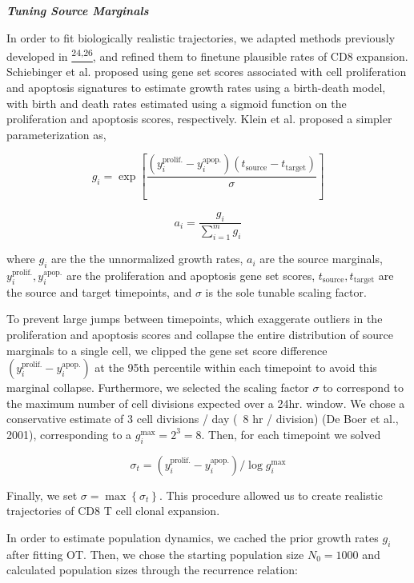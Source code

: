 \emph{\textbf{Tuning Source Marginals}}

In order to fit biologically realistic trajectories, we adapted methods
previously developed in
\href{https://sciwheel.com/work/citation?ids=6347423,17428135\&pre=\&pre=\&suf=\&suf=\&sa=0,0\&dbf=0\&dbf=0}{\textsuperscript{24,26}},
and refined them to finetune plausible rates of CD8 expansion.
Schiebinger et al. proposed using gene set scores associated with cell
proliferation and apoptosis signatures to estimate growth rates using a
birth-death model, with birth and death rates estimated using a sigmoid
function on the proliferation and apoptosis scores, respectively. Klein
et al. proposed a simpler parameterization as,

\[g_{i} = \mathrm{\exp}\left\lbrack \frac{(y_{i}^{\mathrm{\text{prolif.}}} - y_{i}^{\mathrm{\text{apop.}}})(t_{\mathrm{\text{source}}} - t_{\mathrm{\text{target}}})}{\sigma} \right\rbrack\]

\[a_{i} = \frac{g_{i}}{\sum_{i = 1}^{m}g_{i}}\]

where \(g_{i}\) are the the unnormalized growth rates, \(a_{i}\) are the
source marginals,
\(y_{i}^{\mathrm{\text{prolif.}}},y_{i}^{\mathrm{\text{apop.}}}\) are
the proliferation and apoptosis gene set scores,
\(t_{\mathrm{\text{source}}},t_{\mathrm{\text{target}}}\) are the source
and target timepoints, and \(\sigma\) is the sole tunable scaling
factor.

To prevent large jumps between timepoints, which exaggerate outliers in
the proliferation and apoptosis scores and collapse the entire
distribution of source marginals to a single cell, we clipped the gene
set score difference
\((y_{i}^{\mathrm{\text{prolif.}}} - y_{i}^{\mathrm{\text{apop.}}})\) at
the 95th percentile within each timepoint to avoid this marginal
collapse. Furthermore, we selected the scaling factor \(\sigma\) to
correspond to the maximum number of cell divisions expected over a 24hr.
window. We chose a conservative estimate of 3 cell divisions / day (~8
hr / division) (De Boer et al., 2001), corresponding to a
\(g_{i}^{\mathrm{\max}} = 2^{3} = 8\). Then, for each timepoint we
solved

\[\sigma_{t} = (y_{i}^{\mathrm{\text{prolif.}}} - y_{i}^{\mathrm{\text{apop.}}})/\mathrm{\log}g_{i}^{\mathrm{\max}}\]

Finally, we set \(\sigma = \mathrm{\max}\left\{ \sigma_{t} \right\}\).
This procedure allowed us to create realistic trajectories of CD8 T cell
clonal expansion.

In order to estimate population dynamics, we cached the prior growth
rates \(g_{i}\) after fitting OT. Then, we chose the starting population
size \(N_{0} = 1000\) and calculated population sizes through the
recurrence relation:

